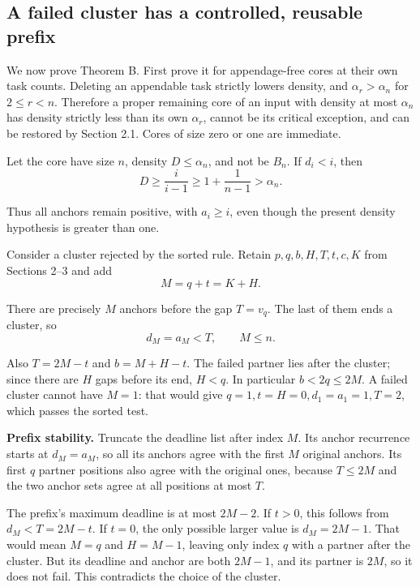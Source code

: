 \documentclass[11pt,a4paper]{article}
\begin{document}
\hypertarget{a-failed-cluster-has-a-controlled-reusable-prefix}{%
\subsection{A failed cluster has a controlled, reusable prefix}\label{a-failed-cluster-has-a-controlled-reusable-prefix}}

We now prove Theorem B. First prove it for appendage-free cores at their own task counts. Deleting an appendable task strictly lowers density, and \(\alpha_r>\alpha_n\) for \(2\le r<n\). Therefore a proper remaining core of an input with density at most \(\alpha_n\) has density strictly less than its own \(\alpha_r\), cannot be its critical exception, and can be restored by Section 2.1. Cores of size zero or one are immediate.

Let the core have size \(n\), density \(D\le\alpha_n\), and not be \(B_n\). If \(d_i<i\), then
\[
D\ge\frac i{i-1}\ge1+\frac1{n-1}>\alpha_n.
\]

Thus all anchors remain positive, with \(a_i\ge i\), even though the present density hypothesis is greater than one.

Consider a cluster rejected by the sorted rule. Retain \(p,q,b,H,T,t,c,K\) from Sections 2--3 and add
\begin{equation}
M=q+t=K+H.
\tag{8.6}
\label{eq:8.6}
\end{equation}

There are precisely \(M\) anchors before the gap \(T=v_q\). The last of them ends a cluster, so
\[
d_M=a_M<T,\qquad M\le n.
\]

Also \(T=2M-t\) and \(b=M+H-t\). The failed partner lies after the cluster; since there are \(H\) gaps before its end, \(H<q\). In particular \(b<2q\le2M\). A failed cluster cannot have \(M=1\): that would give \(q=1,t=H=0,d_1=a_1=1,T=2\), which passes the sorted test.

\textbf{Prefix stability.} Truncate the deadline list after index \(M\). Its anchor recurrence starts at \(d_M=a_M\), so all its anchors agree with the first \(M\) original anchors. Its first \(q\) partner positions also agree with the original ones, because \(T\le2M\) and the two anchor sets agree at all positions at most \(T\).

The prefix's maximum deadline is at most \(2M-2\). If \(t>0\), this follows from \(d_M<T=2M-t\). If \(t=0\), the only possible larger value is \(d_M=2M-1\). That would mean \(M=q\) and \(H=M-1\), leaving only index \(q\) with a partner after the cluster. But its deadline and anchor are both \(2M-1\), and its partner is \(2M\), so it does not fail. This contradicts the choice of the cluster.
\end{document}

